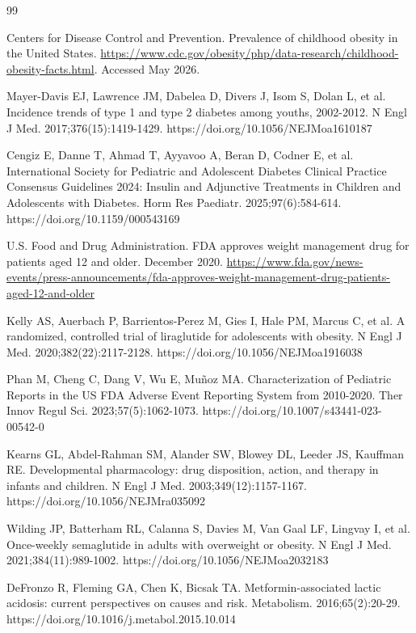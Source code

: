 \documentclass[10pt,a4paper]{article}
\begin{document}
\begingroup
\singlespacing\footnotesize
\begin{thebibliography}{99}

Centers for Disease Control and Prevention.
Prevalence of childhood obesity in the United States.
\url{https://www.cdc.gov/obesity/php/data-research/childhood-obesity-facts.html}.
Accessed May 2026.

Mayer-Davis EJ, Lawrence JM, Dabelea D, Divers J, Isom S, Dolan L, et al.
Incidence trends of type 1 and type 2 diabetes among youths, 2002-2012.
N Engl J Med. 2017;376(15):1419-1429.
https://doi.org/10.1056/NEJMoa1610187

Cengiz E, Danne T, Ahmad T, Ayyavoo A, Beran D, Codner E, et al.
International Society for Pediatric and Adolescent Diabetes Clinical Practice Consensus Guidelines 2024: Insulin and Adjunctive Treatments in Children and Adolescents with Diabetes.
Horm Res Paediatr. 2025;97(6):584-614.
https://doi.org/10.1159/000543169

U.S. Food and Drug Administration.
FDA approves weight management drug for patients aged 12 and older. December 2020.
\url{https://www.fda.gov/news-events/press-announcements/fda-approves-weight-management-drug-patients-aged-12-and-older}

Kelly AS, Auerbach P, Barrientos-Perez M, Gies I, Hale PM, Marcus C, et al.
A randomized, controlled trial of liraglutide for adolescents with obesity.
N Engl J Med. 2020;382(22):2117-2128.
https://doi.org/10.1056/NEJMoa1916038

Phan M, Cheng C, Dang V, Wu E, Mu\~{n}oz MA.
Characterization of Pediatric Reports in the US FDA Adverse Event Reporting System from 2010-2020.
Ther Innov Regul Sci. 2023;57(5):1062-1073.
https://doi.org/10.1007/s43441-023-00542-0

Kearns GL, Abdel-Rahman SM, Alander SW, Blowey DL, Leeder JS, Kauffman RE.
Developmental pharmacology: drug disposition, action, and therapy in infants and children.
N Engl J Med. 2003;349(12):1157-1167.
https://doi.org/10.1056/NEJMra035092

Wilding JP, Batterham RL, Calanna S, Davies M, Van Gaal LF, Lingvay I, et al.
Once-weekly semaglutide in adults with overweight or obesity.
N Engl J Med. 2021;384(11):989-1002.
https://doi.org/10.1056/NEJMoa2032183

DeFronzo R, Fleming GA, Chen K, Bicsak TA.
Metformin-associated lactic acidosis: current perspectives on causes and risk.
Metabolism. 2016;65(2):20-29.
https://doi.org/10.1016/j.metabol.2015.10.014


\end{thebibliography}
\end{document}
